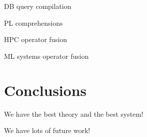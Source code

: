 \documentclass{vldb}
\begin{document}
DB query compilation

PL comprehensions

HPC operator fusion

ML systems operator fusion

\section{Conclusions}

We have the best theory and the best system!

We have lots of future work!

\small

  
\normalsize
\end{document}
